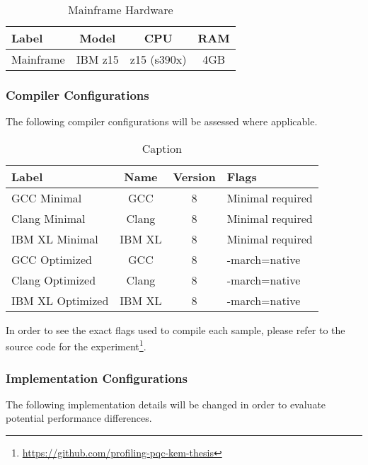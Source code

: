 \begin{table}[H]
    \centering
    \begin{tabular}{l|c|c|c}
        Label & Model & CPU & RAM\\
        \hline
        Mainframe & IBM z15 & z15 (s390x) & 4GB\\
    \end{tabular}
    \caption{Mainframe Hardware}
    \label{table:method:mainframe-hardware}
\end{table}

\subsubsection{Compiler Configurations}

The following compiler configurations will be assessed where applicable.

\begin{table}[]
    \centering
    \begin{tabular}{l|c|c|p{4cm}}
        Label & Name & Version & Flags \\
        \hline
        GCC Minimal & GCC & 8 & Minimal required\\
        Clang Minimal & Clang & 8 & Minimal required\\
        IBM XL Minimal & IBM XL & 8 & Minimal required\\
        GCC Optimized & GCC & 8 & -march=native\\
        Clang Optimized & Clang & 8 & -march=native\\
        IBM XL Optimized & IBM XL & 8 & -march=native\\
    \end{tabular}
    \caption{Caption}
    \label{table:method:compilers}
\end{table}

In order to see the exact flags used to compile each sample, please refer to the source code for the experiment\footnote{\href{https://github.com/profiling-pqc-kem-thesis}{https://github.com/profiling-pqc-kem-thesis}}.

\subsubsection{Implementation Configurations}

The following implementation details will be changed in order to evaluate potential performance differences.

